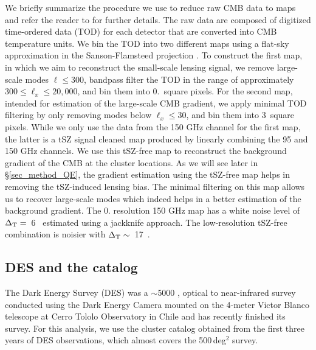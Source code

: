We briefly summarize the procedure we use to reduce raw CMB data to maps and refer the reader to \cite{henning18} for further details. 
The raw data are composed of digitized time-ordered data (TOD) for each detector that are converted into CMB temperature units. %
We bin the TOD into two different maps using a flat-sky approximation in the Sanson-Flamsteed projection \citep{calabretta02, schaffer11}. 
To construct the first map, in which we aim to reconstruct the small-scale lensing signal, we remove large-scale modes $\ell \le 300$, bandpass filter the TOD in the range of approximately $300 \le \ell_{x} \le 20,000$, and bin them into 0.\ square pixels.
For the second map, intended for estimation of the large-scale CMB gradient, we apply minimal TOD filtering by only removing modes below $\ell_{x} \le 30$, and bin them into 3\am\ square pixels.
While we only use the data from the 150 GHz channel for the first map, the latter is a tSZ signal cleaned map produced by linearly combining the 95 and 150 GHz channels. 
We use this tSZ-free map to reconstruct the background gradient of the CMB at the cluster locations.
As we will see later in \S\ref{sec_method_QE}, the gradient estimation using the tSZ-free map helps in removing the tSZ-induced lensing bias.
The minimal filtering on this map allows us to recover large-scale modes which indeed helps in a better estimation of the background gradient.
The 0. resolution 150 GHz map has a white noise level of \mbox{$\Delta_{\rm T} = $ 6 \ukam} estimated using a jackknife approach. %
The low-resolution tSZ-free combination is noisier with \mbox{$\Delta_{\rm T} \sim $ 17 \ukam}.
\subsection{DES and the {\rm \RM} catalog}\label{sec_DES}
The Dark Energy Survey (DES) was a $\sim$5000 \sqdeg, optical to near-infrared survey conducted using the Dark Energy Camera \citep{flaugher15} mounted on the 4-meter Victor Blanco telescope at Cerro Tololo Observatory in Chile and has recently finished its survey. 
For this analysis, we use the cluster catalog obtained from the first three years of DES observations, which almost covers the \sptpol{} 500\,deg$^{2}$ survey. 

